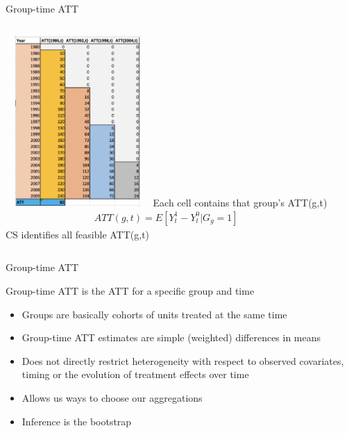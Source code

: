 \documentclass{beamer}
\begin{document}
\begin{frame}{Group-time ATT}
       \begin{columns}
             \centering
             \includegraphics[height=6.5cm, width=5.5cm]{./lecture_includes/baker_attgt}
            Each cell contains that group's ATT(g,t)
\begin{eqnarray*}
ATT(g,t) = E[Y_t^1 - Y_t^0 | G_g=1]
\end{eqnarray*}CS identifies all feasible ATT(g,t)
         \end{columns} 
    \end{frame}




\begin{frame}{Group-time ATT}

Group-time ATT is the ATT for a specific group and time
\begin{itemize}
\item Groups are basically cohorts of units treated at the same time
\item Group-time ATT estimates are simple (weighted) differences in means
\item Does not directly restrict heterogeneity with respect to observed covariates, timing or the evolution of treatment effects over time
\item Allows us ways to choose our aggregations
\item Inference is the bootstrap
\end{itemize}

\end{frame}
\end{document}

